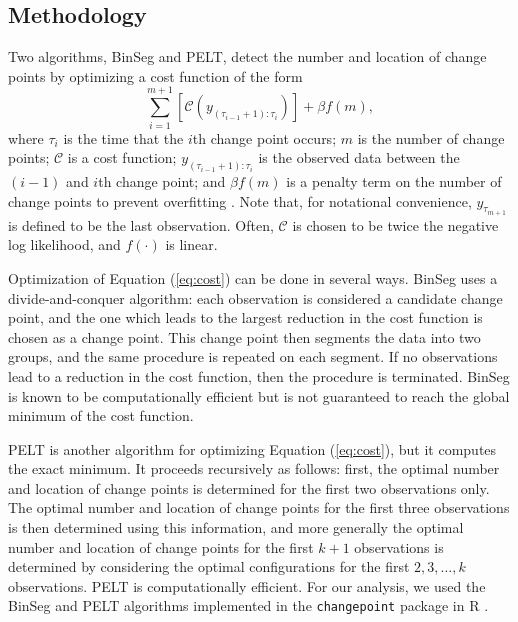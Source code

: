 \documentclass[12pt]{article}
\providecommand{\DIFaddtex}[1]{{\protect\color{blue}\uwave{#1}}} %
\providecommand{\DIFdeltex}[1]{{\protect\color{red}\sout{#1}}}                      %
\providecommand{\DIFaddbegin}{} %
\providecommand{\DIFaddend}{} %
\providecommand{\DIFdelbegin}{} %
\providecommand{\DIFdelend}{} %
\providecommand{\DIFadd}[1]{\texorpdfstring{\DIFaddtex{#1}}{#1}} %
\providecommand{\DIFdel}[1]{\texorpdfstring{\DIFdeltex{#1}}{}} %
\begin{document}
\begin{doublespacing}
\subsection{Methodology}
\label{ssec:methodology}

Two algorithms, BinSeg and PELT, detect the number and location of change points by optimizing a cost function of the form
\begin{equation}
	\sum_{i=1}^{m+1} [\mathcal{C}(y_{(\tau_{i-1}+1):\tau_i})] + \beta f(m),
	\label{eq:cost}
\end{equation}
where $\tau_i$ is the time that the $i$th change point occurs; $m$ is the number of change points; $\mathcal{C}$ is a cost function; $y_{(\tau_{i-1}+1):\tau_i}$ is the observed data between the $(i-1)$ and $i$th change point; and $\beta f(m)$ is a penalty term on the number of change points to prevent overfitting \cite{killick12}.  Note that, for notational convenience, \DIFdelbegin \DIFdel{$y_{\tau_{m+1}}$ }\DIFdelend \DIFaddbegin \DIFadd{$\tau_{m+1}$ }\DIFaddend is defined to be the \DIFaddbegin \DIFadd{time of the }\DIFaddend last observation.  Often, $\mathcal{C}$ is chosen to be twice the negative log likelihood, and $f(\cdot)$ is linear.

Optimization of Equation (\ref{eq:cost}) can be done in several ways.  BinSeg uses a divide-and-conquer algorithm: each observation is considered a candidate change point, and the one which leads to the largest reduction in the cost function is chosen as a change point.  This change point then segments the data into two groups, and the same procedure is repeated on each segment.  If no observations lead to a reduction in the cost function, then the procedure is terminated.  BinSeg is known to be computationally efficient but is not guaranteed to reach the global minimum of the cost function.

PELT is another algorithm for optimizing Equation (\ref{eq:cost}), but it computes the exact minimum.  It proceeds recursively as follows: first, the optimal number and location of change points is determined for the first two observations  only.  The optimal number and location of change points for the first three observations is then determined using this information, and more generally the optimal number and location of change points for the first $k+1$ observations is determined by considering the optimal configurations for the first $2, 3, \ldots, k$ observations.  PELT is computationally efficient.  For our analysis, we used the BinSeg and PELT algorithms implemented in the \texttt{changepoint} package in R \cite{killick14}.


\end{doublespacing}
\end{document}
